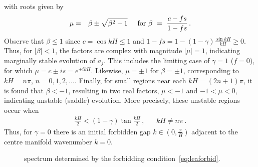 \documentclass[12pt,a5paper]{article}
\newcommand{\gaj}[1]{%
  \pdfcomment[author=GAJ,color={0 1 1},subject={#1}]{#1}}
\begin{document}
with roots given by
\begin{eqnarray}
\mu & = & \beta\pm\sqrt{\beta^2-1}
\hspace*{5mm}\mbox{for } 
\beta~=~\frac{c-fs}{1-fs}\,.
\end{eqnarray}
Observe that $\beta\le 1$ since $c=\cos kH\le 1$ and 
$1-fs=1-(1-\gamma)\frac{\sin kH}{kH}\ge 0$.
Thus, for $|\beta|<1$, the factors are complex with magnitude 
$|\mu|=1$,
indicating marginally stable evolution of $a_j$. 
This includes the limiting case of $\gamma=1$ ($f=0$), for which
$\mu=c\pm is=e^{\pm ikH}$.
Likewise, $\mu=\pm 1$ for $\beta=\pm 1$, corresponding to $kH=n\pi$, $n=0,1,2,\ldots$.
Finally, for small regions near each $kH=(2n+1)\pi$, 
it is found that $\beta<-1$, resulting in two real factors,
$\mu<-1$ and $-1<\mu<0$, indicating unstable (saddle) evolution.
More precisely, these unstable regions occur when
\begin{eqnarray}
\frac{kH}{2} <(1-\gamma)\tan\frac{kH}{2}\,, && kH\ne n\pi\,.
\label{eq:leaforbid}
\end{eqnarray}
Thus, for $\gamma=0$ there is an initial forbidden gap $k\in(0,\frac{\pi}{H})$ adjacent to the centre manifold
wavenumber $k=0$.
\gaj{What am I trying to say here?}

\begin{figure}
\centering
{}
\caption{spectrum determined by the forbidding condition~\eqref{eq:leaforbid}.}
\label{fig:leaspec}
\end{figure}
\end{document}
